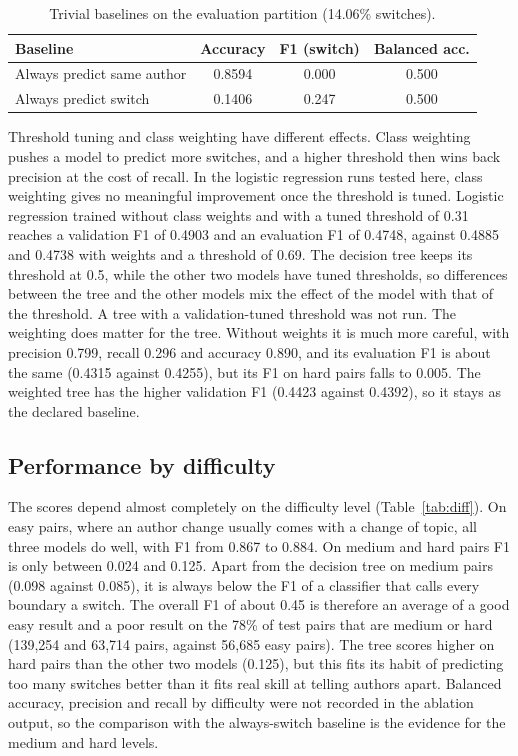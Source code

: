 \documentclass[runningheads]{llncs}
\newcommand{\tablefont}{\scriptsize\setlength{\tabcolsep}{3pt}}
\begin{document}
\begin{table}[t]
\centering
\caption{Trivial baselines on the evaluation partition (14.06\% switches).}
\label{tab:baselines}
\tablefont
\begin{tabular}{lccc}
\toprule
\textbf{Baseline} & \textbf{Accuracy} & \textbf{F1 (switch)} & \textbf{Balanced acc.} \\
\midrule
Always predict same author & 0.8594 & 0.000 & 0.500 \\
Always predict switch      & 0.1406 & 0.247 & 0.500 \\
\bottomrule
\end{tabular}
\end{table}

Threshold tuning and class weighting have different effects. Class weighting pushes a model to predict more switches, and a higher threshold then wins back precision at the cost of recall. In the logistic regression runs tested here, class weighting gives no meaningful improvement once the threshold is tuned. Logistic regression trained without class weights and with a tuned threshold of 0.31 reaches a validation F1 of 0.4903 and an evaluation F1 of 0.4748, against 0.4885 and 0.4738 with weights and a threshold of 0.69. The decision tree keeps its threshold at 0.5, while the other two models have tuned thresholds, so differences between the tree and the other models mix the effect of the model with that of the threshold. A tree with a validation-tuned threshold was not run. The weighting does matter for the tree. Without weights it is much more careful, with precision 0.799, recall 0.296 and accuracy 0.890, and its evaluation F1 is about the same (0.4315 against 0.4255), but its F1 on hard pairs falls to 0.005. The weighted tree has the higher validation F1 (0.4423 against 0.4392), so it stays as the declared baseline.

\subsection{Performance by difficulty}

The scores depend almost completely on the difficulty level (Table~\ref{tab:diff}). On easy pairs, where an author change usually comes with a change of topic, all three models do well, with F1 from 0.867 to 0.884. On medium and hard pairs F1 is only between 0.024 and 0.125. Apart from the decision tree on medium pairs (0.098 against 0.085), it is always below the F1 of a classifier that calls every boundary a switch. The overall F1 of about 0.45 is therefore an average of a good easy result and a poor result on the 78\% of test pairs that are medium or hard (139,254 and 63,714 pairs, against 56,685 easy pairs). The tree scores higher on hard pairs than the other two models (0.125), but this fits its habit of predicting too many switches better than it fits real skill at telling authors apart. Balanced accuracy, precision and recall by difficulty were not recorded in the ablation output, so the comparison with the always-switch baseline is the evidence for the medium and hard levels.
\end{document}
